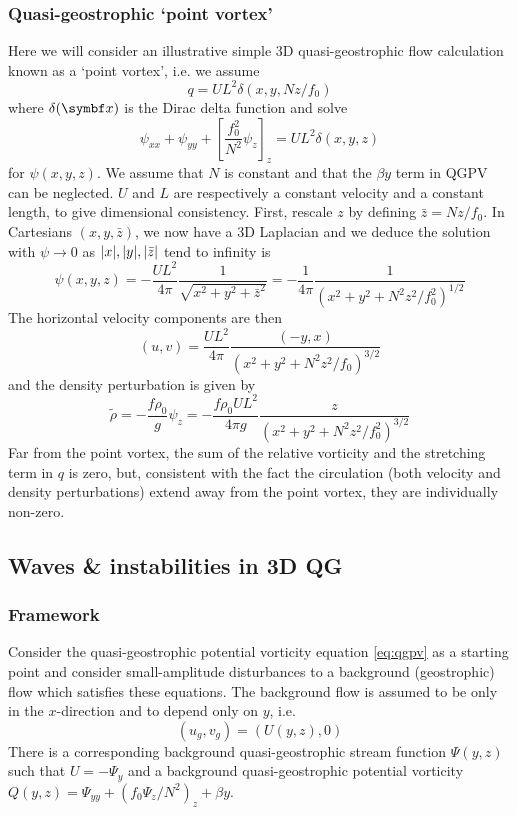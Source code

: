 \documentclass{jknotes}
\begin{document}
\subsubsection{Quasi-geostrophic `point vortex'}
Here we will consider an illustrative simple 3D quasi-geostrophic flow
calculation known as a `point vortex', i.e. we assume
\begin{equation}
	q = U L^2 \delta(x,y, Nz/f_0)
\end{equation}
where $\delta(\x)$ is the Dirac delta function and solve
\begin{equation}
	\psi_{xx} + \psi_{yy} + \left[ \frac{f_0^2}{N^2} \psi_z\right]_z = UL^2
	\delta(x,y,z)
\end{equation}
for $\psi(x,y,z)$. We assume that $N$ is constant and that the $\beta y$ term
in QGPV can be neglected. $U$ and $L$ are respectively a constant velocity and
a constant length, to give dimensional consistency. First, rescale $z$ by
defining $\bar{z} = Nz/f_0$. In Cartesians $(x,y,\bar{z})$, we now have a 3D
Laplacian and we deduce the solution with $\psi \to 0$ as $\abs{x}, \abs{y},
\abs{\bar{z}}$ tend to infinity is
\begin{equation}
	\psi(x,y,z) = -\frac{UL^2}{4\pi} \frac{1}{\sqrt{x^2+y^2+\bar{z}^2}} =
	-\frac{1}{4\pi} \frac{1}{(x^2+y^2+N^2z^2/f_0^2)^{1/2}}
\end{equation}
The horizontal velocity components are then
\begin{equation}
	(u,v) = \frac{UL^2}{4\pi} \frac{(-y,x)}{(x^2+y^2+N^2z^2/f_0)^{3/2}}
\end{equation}
and the density perturbation is given by
\begin{equation}
	\tilde{\rho} = -\frac{f \rho_0}{g} \psi_z = -\frac{f \rho_0 U L^2}{4\pi g}
	\frac{z}{(x^2+y^2+N^2z^2/f_0^2)^{3/2}}
\end{equation}
Far from the point vortex, the sum of the relative vorticity and the
stretching term in $q$ is zero, but, consistent with the fact the circulation
(both velocity and density perturbations) extend away from the point vortex,
they are individually non-zero.

\subsection{Waves \& instabilities in 3D QG}
\subsubsection{Framework}
Consider the quasi-geostrophic potential vorticity equation \eqref{eq:qgpv} as
a starting point and consider small-amplitude disturbances to a background
(geostrophic) flow which satisfies these equations. The background flow is
assumed to be only in the $x$-direction and to depend only on $y$, i.e.
\begin{equation}
	(u_g,v_g) = (U(y,z), 0)
\end{equation}
There is a corresponding background quasi-geostrophic stream function
$\Psi(y,z)$ such that $U = -\Psi_y$ and a background quasi-geostrophic
potential vorticity $Q(y,z) = \Psi_{yy} + (f_0\Psi_z/N^2)_z + \beta y$.
\end{document}
